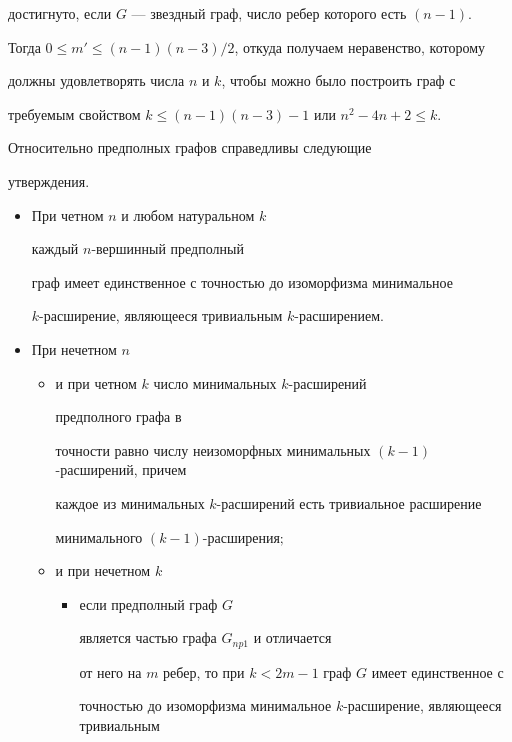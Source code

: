 достигнуто, если $G$ --- звездный граф, число ребер которого есть $(n-1)$.


Тогда $0 \leq m' \leq (n-1)(n-3)/2$, откуда получаем неравенство, которому


должны удовлетворять числа $n$ и $k$, чтобы можно было построить граф с


требуемым свойством $k \leq (n-1)(n-3) - 1$ или $n^2 - 4n + 2 \leq k$.





\begin{thm}


Относительно предполных графов справедливы следующие


утверждения.


\begin{itemize}


\item[1.] При четном $n$ и любом натуральном $k$


каждый $n$-вершинный предполный


граф имеет единственное с точностью до изоморфизма минимальное


$k$-расширение, являющееся тривиальным $k$-расширением.


\item[2.] При нечетном $n$


\begin{itemize}


\item[а)] и при четном $k$ число минимальных $k$-расширений 


предполного графа в


точности равно числу неизоморфных минимальных $(k-1)$-расширений, причем


каждое из минимальных $k$-расширений есть тривиальное расширение


минимального $(k-1)$-расширения$;$


\item[б)] и при нечетном $k$


\begin{itemize}


\item[i)] если предполный граф $G$ 


является частью графа $G_{np1}$ и отличается


от него на $m$ ребер, то при $k < 2m - 1$ граф $G$ имеет единственное с


точностью до изоморфизма минимальное $k$-расширение, являющееся тривиальным



\end{itemize}
\end{itemize}
\end{itemize}
\end{thm}
